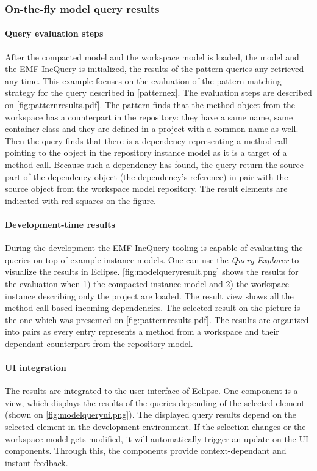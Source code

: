 \subsubsection{On-the-fly model query results}
\paragraph{Query evaluation steps}
After the compacted  model and the workspace model is loaded, the model and the
EMF-IncQuery is initialized, the results of the pattern queries any retrieved
any time. This example focuses on the evaluation of the pattern matching
strategy for the query described in \autoref{patternex}. The evaluation steps 
are described on \autoref{fig:patternresults.pdf}.
The pattern finds that the  method object from the
workspace has a counterpart in the repository: they have a same name, same
container class and they are defined in a project with a common name as well.
Then the query finds that there is a dependency representing a method call
pointing to the  object in the repository instance model as
it is a target of a method call. Because such a dependency has found, the query
return the source part of the dependency object (the dependency's 
reference) in pair with the source object from the workspace model repository.
The result elements are indicated with red squares on the figure.

\paragraph{Development-time results}
During the development the EMF-IncQuery tooling is capable of evaluating the
queries on top of example instance models. One can use the \emph{Query Explorer}
to visualize the results in Eclipse.
\autoref{fig:modelqueryresult.png} shows the results for the evaluation when
 1) the compacted instance model and  2) the workspace instance describing only the
 project are loaded.
The result view shows all the method call based incoming dependencies. The
selected result on the picture is the one which was presented on
\autoref{fig:patternresults.pdf}. The results are organized into pairs as every
entry represents a method from a workspace and their dependant counterpart
from the repository model.

\paragraph{UI integration}
The results are integrated to the user interface of Eclipse. One component is a
view, which displays the results of the queries depending of the selected
element (shown on \autoref{fig:modelqueryui.png}). 
The displayed query results depend on the selected element in the development
environment. If the selection changes or the workspace model gets modified,
it will automatically trigger an update on the UI components. Through this,
the components provide context-dependant and instant feedback.

